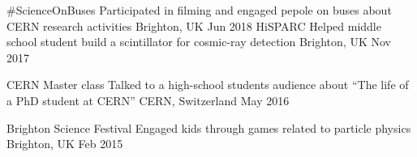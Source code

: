 
\begin{cvhonors}
  \cvhonor 
      {\#ScienceOnBuses}
      {Participated in filming and engaged pepole on buses about CERN research activities}
      {Brighton, UK}
      {Jun 2018}
  \cvhonor 
      {HiSPARC}
      {Helped middle school student build a scintillator for cosmic-ray detection}
      {Brighton, UK}
      {Nov 2017}

  \cvhonor
      {CERN Master class}
      {Talked to a high-school students audience about ``The life of a PhD student at CERN''}
      {CERN, Switzerland}
      {May 2016}

  \cvhonor
      {Brighton Science Festival}
      {Engaged kids through games related to particle physics}
      {Brighton, UK}
      {Feb 2015}

\end{cvhonors}
